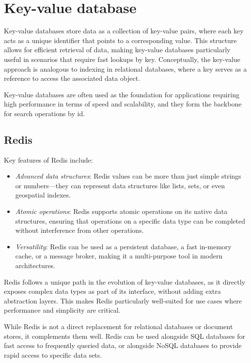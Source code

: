 \section{Key-value database}

Key-value databases store data as a collection of key-value pairs, where each key acts as a unique identifier that points to a corresponding value. 
This structure allows for efficient retrieval of data, making key-value databases particularly useful in scenarios that require fast lookups by key. 
Conceptually, the key-value approach is analogous to indexing in relational databases, where a key serves as a reference to access the associated data object.

Key-value databases are often used as the foundation for applications requiring high performance in terms of speed and scalability, and they form the backbone for search operations by id.

\subsection{Redis}
Key features of Redis include:
\begin{itemize} 
    \item \textit{Advanced data structures}: Redis values can be more than just simple strings or numbers—they can represent data structures like lists, sets, or even geospatial indexes. 
    \item \textit{Atomic operations}: Redis supports atomic operations on its native data structures, ensuring that operations on a specific data type can be completed without interference from other operations. 
    \item \textit{Versatility}: Redis can be used as a persistent database, a fast in-memory cache, or a message broker, making it a multi-purpose tool in modern architectures. 
\end{itemize}
Redis follows a unique path in the evolution of key-value databases, as it directly exposes complex data types as part of its interface, without adding extra abstraction layers. 
This makes Redis particularly well-suited for use cases where performance and simplicity are critical.

While Redis is not a direct replacement for relational databases or document stores, it complements them well. 
Redis can be used alongside SQL databases for fast access to frequently queried data, or alongside NoSQL databases to provide rapid access to specific data sets.

